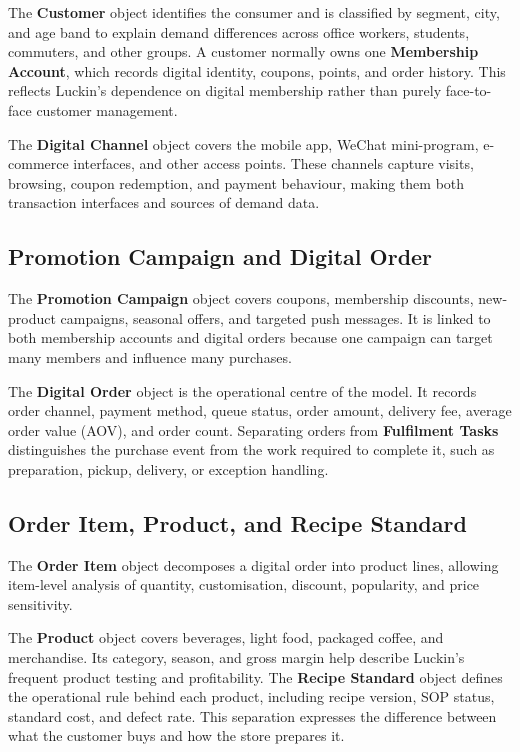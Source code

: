 \documentclass[12pt,a4paper]{article}
\begin{document}
The \textbf{Customer} object identifies the consumer and is classified by segment, city, and age band to explain demand differences across office workers, students, commuters, and other groups. A customer normally owns one \textbf{Membership Account}, which records digital identity, coupons, points, and order history. This reflects Luckin's dependence on digital membership rather than purely face-to-face customer management.

The \textbf{Digital Channel} object covers the mobile app, WeChat mini-program, e-commerce interfaces, and other access points. These channels capture visits, browsing, coupon redemption, and payment behaviour, making them both transaction interfaces and sources of demand data.

\subsection{Promotion Campaign and Digital Order}

The \textbf{Promotion Campaign} object covers coupons, membership discounts, new-product campaigns, seasonal offers, and targeted push messages. It is linked to both membership accounts and digital orders because one campaign can target many members and influence many purchases.

The \textbf{Digital Order} object is the operational centre of the model. It records order channel, payment method, queue status, order amount, delivery fee, average order value (AOV), and order count. Separating orders from \textbf{Fulfilment Tasks} distinguishes the purchase event from the work required to complete it, such as preparation, pickup, delivery, or exception handling.

\subsection{Order Item, Product, and Recipe Standard}

The \textbf{Order Item} object decomposes a digital order into product lines, allowing item-level analysis of quantity, customisation, discount, popularity, and price sensitivity.

The \textbf{Product} object covers beverages, light food, packaged coffee, and merchandise. Its category, season, and gross margin help describe Luckin's frequent product testing and profitability. The \textbf{Recipe Standard} object defines the operational rule behind each product, including recipe version, SOP status, standard cost, and defect rate. This separation expresses the difference between what the customer buys and how the store prepares it.
\end{document}
